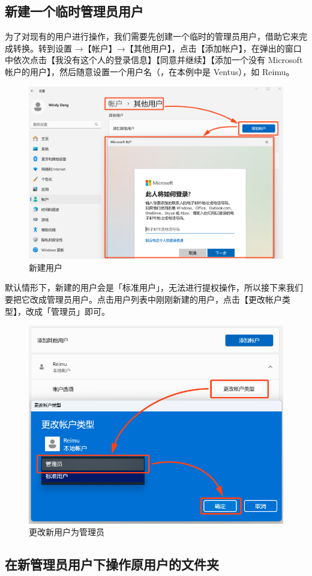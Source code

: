 {{{\subsection{新建一个临时管理员用户}

为了对现有的用户进行操作，我们需要先创建一个临时的管理员用户，借助它来完成转换。转到设置 →【帐户】→【其他用户】，点击【添加帐户】，在弹出的窗口中依次点击【我没有这个人的登录信息】【同意并继续】【添加一个没有 Microsoft 帐户的用户】，然后随意设置一个用户名（，在本例中是 Ventus），如 Reimu。

\begin{figure}[htb!]
  \centering
  \includegraphics[width=.7\textwidth]{assets/advanced/New_User.png}
  \caption{新建用户}
  \label{fig:New_User}
\end{figure}

默认情形下，新建的用户会是「标准用户」，无法进行提权操作，所以接下来我们要把它改成管理员用户。点击用户列表中刚刚新建的用户，点击【更改帐户类型】，改成「管理员」即可。

\begin{figure}[htb!]
  \centering
  \includegraphics[width=.5\textwidth]{assets/advanced/Change_User_Type.png}
  \caption{更改新用户为管理员}
  \label{fig:Change_User_Type}
\end{figure}

\subsection{在新管理员用户下操作原用户的文件夹}

}}}
